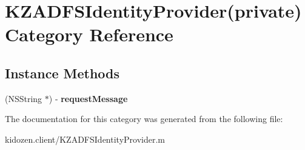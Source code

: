 \hypertarget{category_k_z_a_d_f_s_identity_provider_07private_08}{\section{K\-Z\-A\-D\-F\-S\-Identity\-Provider(private) Category Reference}
\label{category_k_z_a_d_f_s_identity_provider_07private_08}
}
\subsection*{Instance Methods}
\begin{DoxyCompactItemize}
\item 
\hypertarget{category_k_z_a_d_f_s_identity_provider_07private_08_a5dba711bb67ea965ac9fdaac61ddf227}{(N\-S\-String $\ast$) -\/ {\bfseries request\-Message}}\label{category_k_z_a_d_f_s_identity_provider_07private_08_a5dba711bb67ea965ac9fdaac61ddf227}

\end{DoxyCompactItemize}


The documentation for this category was generated from the following file\-:\begin{DoxyCompactItemize}
\item 
kidozen.\-client/K\-Z\-A\-D\-F\-S\-Identity\-Provider.\-m\end{DoxyCompactItemize}
